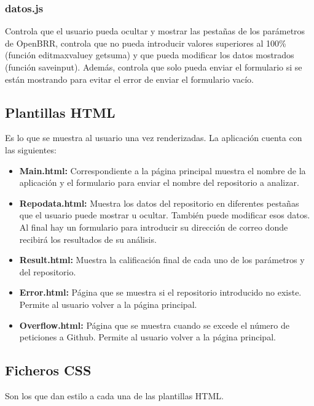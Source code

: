 \documentclass[a4paper, 12pt]{book}
\begin{document}
\subsubsection{datos.js}

Controla que el usuario pueda ocultar y mostrar las pestañas de los parámetros de OpenBRR, controla que no pueda introducir valores superiores al 100\% (función edit\textunderscore max\textunderscore value\textunderscore [parámetro] y get\textunderscore suma) y que pueda modificar los datos mostrados (función save\textunderscore input\textunderscore [parámetro]). Además, controla que solo pueda enviar el formulario si se están mostrando para evitar el error de enviar el formulario vacío.

\subsection{Plantillas HTML}

Es lo que se muestra al usuario una vez renderizadas. La aplicación cuenta con las siguientes:

\begin{itemize}
	\item \textbf{Main.html:} Correspondiente a la página principal muestra el nombre de la aplicación y el formulario para enviar el nombre del repositorio a analizar.
	\item \textbf{Repo\textunderscore data.html:} Muestra los datos del repositorio en diferentes pestañas que el usuario puede mostrar u ocultar. También puede modificar esos datos. Al final hay un formulario para introducir su dirección de correo donde recibirá los resultados de su análisis.
	\item \textbf{Result.html:} Muestra la calificación final de cada uno de los parámetros y del repositorio.
	\item \textbf{Error.html:} Página que se muestra si el repositorio introducido no existe. Permite al usuario volver a la página principal.
	\item \textbf{Overflow.html:} Página que se muestra cuando se excede el número de peticiones a Github. Permite al usuario volver a la página principal.
\end{itemize}

\subsection{Ficheros CSS}

Son los que dan estilo a cada una de las plantillas HTML.
\end{document}
